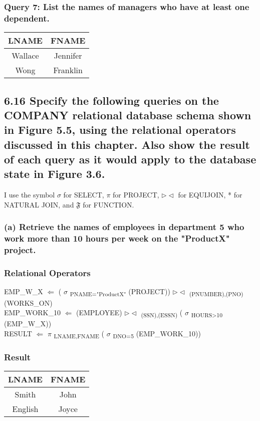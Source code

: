 \documentclass[11pt, oneside]{article}   	%
\begin{document}
\subsubsection*{Query 7: List the names of managers who have at least one dependent.}
\begin{center}
\begin{tabular}{ c | c }
  LNAME & FNAME \\ \hline
  Wallace & Jennifer \\
  Wong & Franklin \\
\end{tabular}
\end{center}

\subsection*{6.16 Specify the following queries on the COMPANY relational database schema shown in Figure 5.5, using the relational operators discussed in this chapter. Also show the result of each query as it would apply to the database state in Figure 3.6.}
I use the symbol $\sigma$ for SELECT, $\pi$ for PROJECT, $\rhd\lhd$ for EQUIJOIN, * for NATURAL JOIN, and $\mathfrak{F}$ for FUNCTION.

\subsubsection*{(a) Retrieve the names of employees in department 5 who work more than 10 hours per week on the "ProductX" project.}
\subsubsection*{Relational Operators}
EMP\_W\_X $\Leftarrow$ ( $\sigma$ \textsubscript{PNAME="ProductX"} (PROJECT)) $\rhd\lhd$ \textsubscript{(PNUMBER),(PNO)} (WORKS\_ON) \\
EMP\_WORK\_10 $\Leftarrow$ (EMPLOYEE) $\rhd\lhd$ \textsubscript{(SSN),(ESSN)} ( $\sigma$ \textsubscript{HOURS>10} (EMP\_W\_X)) \\
RESULT $\Leftarrow$ $\pi$ \textsubscript{LNAME,FNAME} ( $\sigma$ \textsubscript{DNO=5} (EMP\_WORK\_10))

\subsubsection*{Result}
\begin{center}
\begin{tabular}{ c | c }
  LNAME & FNAME \\ \hline
  Smith & John \\
  English & Joyce \\
\end{tabular}
\end{center}
\end{document}
